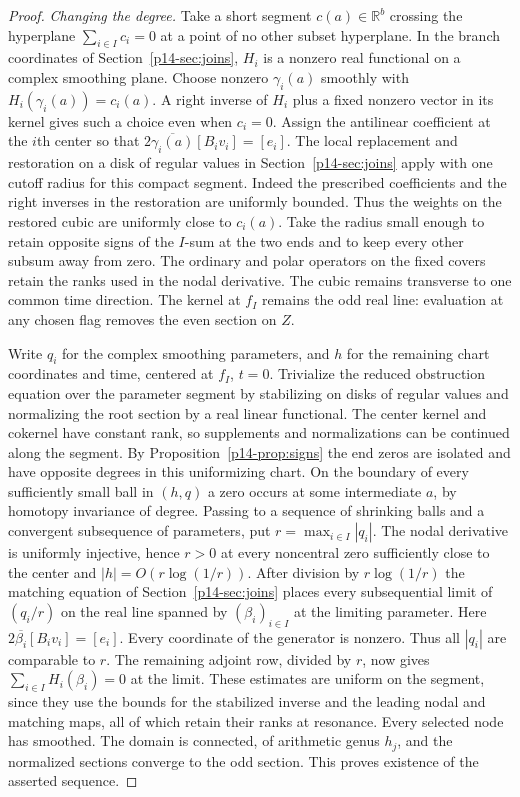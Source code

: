 \begin{proof}
\emph{Changing the degree.}
Take a short segment $c(a)\in\mathbb R^b$ crossing the hyperplane
$\sum_{i\in I}c_i=0$ at a point of no other subset hyperplane.
In the branch coordinates of Section~\ref{p14-sec:joins}, $H_i$ is
a nonzero real functional on a complex smoothing plane. Choose
nonzero $\gamma_i(a)$ smoothly with $H_i(\gamma_i(a))=c_i(a)$.
A right inverse of $H_i$ plus a fixed nonzero vector in its kernel
gives such a choice even when $c_i=0$. Assign the antilinear
coefficient at the $i$th center so that
$2\overline{\gamma_i(a)}[B_iv_i]=[e_i]$.
The local replacement and restoration on a disk of regular values in
Section~\ref{p14-sec:joins} apply with one cutoff radius for this compact
segment. Indeed the prescribed coefficients and the right inverses
in the restoration are uniformly bounded. Thus the weights on the
restored cubic are uniformly close to $c_i(a)$. Take the radius
small enough to retain opposite signs of the $I$-sum at the two ends
and to keep every other subsum away from zero. The ordinary and polar
operators on the fixed covers retain the ranks used in the nodal
derivative. The cubic remains transverse to one common time direction.
The kernel at $f_I$ remains the odd real line: evaluation at any
chosen flag removes the even section on $Z$.

Write $q_i$ for the complex smoothing parameters, and $h$ for the
remaining chart coordinates and time, centered at $f_I$, $t=0$.
Trivialize the reduced obstruction equation over the parameter
segment by stabilizing on disks of regular values and normalizing the
root section by a real linear functional. The center kernel and
cokernel have constant rank, so supplements and normalizations can be
continued along the segment. By Proposition~\ref{p14-prop:signs} the end
zeros are isolated and have opposite degrees in this uniformizing
chart. On the boundary of every sufficiently small ball in $(h,q)$
a zero occurs at some intermediate $a$, by homotopy invariance of
degree. Passing to a sequence of shrinking balls and a convergent
subsequence of parameters, put $r=\max_{i\in I}|q_i|$. The nodal
derivative is uniformly injective, hence $r>0$ at every noncentral
zero sufficiently close to the center and $|h|=O(r\log(1/r))$.
After division by $r\log(1/r)$ the matching equation of
Section~\ref{p14-sec:joins} places every subsequential limit of $(q_i/r)$
on the real line spanned by $(\beta_i)_{i\in I}$ at the limiting
parameter. Here $2\overline{\beta_i}[B_i v_i]=[e_i]$. Every coordinate
of the generator is nonzero. Thus all $|q_i|$ are comparable to $r$.
The remaining adjoint row, divided by $r$, now gives
$\sum_{i\in I}H_i(\beta_i)=0$ at the limit. These estimates are
uniform on the segment, since they use the bounds for the stabilized
inverse and the leading nodal and matching maps, all of which retain
their ranks at resonance. Every selected node has smoothed. The
domain is connected, of arithmetic genus $h_j$, and the normalized
sections converge to the odd section. This proves existence of the
asserted sequence.


\end{proof}
